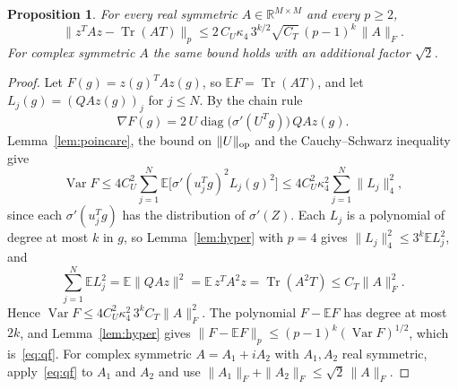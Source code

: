 \documentclass[11pt]{amsart}
\newtheorem{proposition}[theorem]{Proposition}
\theoremstyle{remark}
\numberwithin{equation}{section}
\newcommand{\EE}{\mathbb{E}}
\newcommand{\RR}{\mathbb{R}}
\DeclareMathOperator{\Tr}{Tr}
\DeclareMathOperator{\Var}{Var}
\begin{document}
\begin{proposition}\label{prop:qf}
For every real symmetric $A\in\RR^{M\times M}$ and every $p\ge2$,
\begin{equation}\label{eq:qf}
\bigl\|z^{T}Az-\Tr(AT)\bigr\|_p\le2\,C_U\kappa_4\,3^{k/2}\sqrt{C_T}\,(p-1)^{k}\,\|A\|_F.
\end{equation}
For complex symmetric $A$ the same bound holds with an additional factor $\sqrt2$.
\end{proposition}

\begin{proof}
Let $F(g)=z(g)^{T}Az(g)$, so $\EE F=\Tr(AT)$, and let $L_j(g)=(QAz(g))_j$ for $j\le N$. By the chain rule
\[
\nabla F(g)=2\,U\operatorname{diag}\bigl(\sigma'(U^{T}g)\bigr)\,QAz(g).
\]
Lemma~\ref{lem:poincare}, the bound on $\|U\|_{\rm op}$ and the Cauchy--Schwarz inequality give
\begin{equation}\label{eq:var}
\Var F\le4C_U^2\sum_{j=1}^{N}\EE\bigl[\sigma'(u_j^{T}g)^2L_j(g)^2\bigr]\le4C_U^2\kappa_4^2\sum_{j=1}^{N}\|L_j\|_4^2,
\end{equation}
since each $\sigma'(u_j^{T}g)$ has the distribution of $\sigma'(Z)$. Each $L_j$ is a polynomial of degree at most $k$ in $g$, so Lemma~\ref{lem:hyper} with $p=4$ gives $\|L_j\|_4^2\le3^{k}\EE L_j^2$, and
\[
\sum_{j=1}^{N}\EE L_j^2=\EE\|QAz\|^2=\EE\,z^{T}A^2z=\Tr(A^2T)\le C_T\|A\|_F^2.
\]
Hence $\Var F\le4C_U^2\kappa_4^2\,3^{k}C_T\|A\|_F^2$. The polynomial $F-\EE F$ has degree at most $2k$, and Lemma~\ref{lem:hyper} gives $\|F-\EE F\|_p\le(p-1)^{k}(\Var F)^{1/2}$, which is~\eqref{eq:qf}. For complex symmetric $A=A_1+iA_2$ with $A_1,A_2$ real symmetric, apply~\eqref{eq:qf} to $A_1$ and $A_2$ and use $\|A_1\|_F+\|A_2\|_F\le\sqrt2\,\|A\|_F$.
\end{proof}
\end{document}
